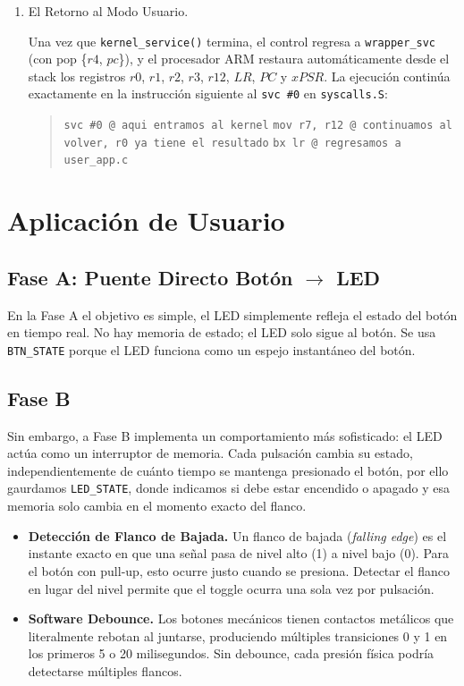 \documentclass[12pt,letterpaper]{article}
\begin{document}
\begin{enumerate}[label=Paso \arabic*.]
\item El Retorno al Modo Usuario.
  
  Una vez que \texttt{kernel\_service()} termina, el control regresa a \texttt{wrapper\_svc} (con pop \{$r4$, $pc$\}), y el procesador ARM restaura automáticamente desde el stack los registros $r0$, $r1$, $r2$, $r3$, $r12$, $LR$, $PC$ y $xPSR$. La ejecución continúa exactamente en la instrucción siguiente al \texttt{svc \#0} en \texttt{syscalls.S}:
  
  \begin{quote}
    \texttt{svc \#0      @ aqui entramos al kernel}
    \texttt{mov r7, r12  @ continuamos al volver, r0 ya tiene el resultado}
    \texttt{bx lr        @ regresamos a user\_app.c}
  \end{quote}
  
\end{enumerate}

\section*{Aplicación de Usuario}

\subsection*{Fase A: Puente Directo Botón $\rightarrow$ LED}

En la Fase A el objetivo es simple, el LED simplemente refleja el estado del botón en tiempo real. No hay memoria de estado; el LED solo sigue al botón. Se usa \texttt{BTN\_STATE} porque el LED funciona como un espejo instantáneo del botón.

\subsection*{Fase B}

Sin embargo, a Fase B implementa un comportamiento más sofisticado: el LED actúa como un interruptor de memoria. Cada pulsación cambia su estado, independientemente de cuánto tiempo se mantenga presionado el botón, por ello gaurdamos \texttt{LED\_STATE}, donde indicamos si debe estar encendido o apagado y esa memoria solo cambia en el momento exacto del flanco.

\begin{itemize}
\item \textbf{Detección de Flanco de Bajada.} Un flanco de bajada (\textit{falling edge}) es el instante exacto en que una señal pasa de nivel alto (1) a nivel bajo (0). Para el botón con pull-up, esto ocurre justo cuando se presiona. Detectar el flanco en lugar del nivel permite que el toggle ocurra una sola vez por pulsación.
  
\item \textbf{Software Debounce.} Los botones mecánicos tienen contactos metálicos que literalmente rebotan al juntarse, produciendo múltiples transiciones 0 y 1 en los primeros 5 o 20 milisegundos. Sin debounce, cada presión física podría detectarse múltiples flancos.
\end{itemize}
\end{document}
